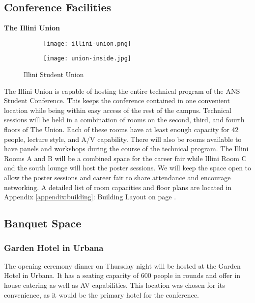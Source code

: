 \subsection{Conference Facilities}

\textbf{The Illini Union}\\

\begin{figure}[H]
	\centering
	\begin{subfigure}{0.5\textwidth}
		\centering
		\texttt{[image: illini-union.png]}
	\end{subfigure}%
	\begin{subfigure}{0.5\textwidth}
		\centering
		\texttt{[image: union-inside.jpg]}
	\end{subfigure}
	\caption{Illini Student Union}		
\end{figure} 


The Illini Union is capable of hosting the entire technical program of the ANS 
Student Conference. This keeps the conference contained in one convenient 
location while being within easy access of the rest of the campus. Technical 
sessions will be held in a combination of rooms on the second, third, and 
fourth floors of The Union. Each of these rooms have at least enough capacity 
for 42 people, lecture style, and A/V capability. There will also be rooms 
available to have panels and workshops during the course of the technical 
program. The Illini Rooms A and B will be a combined space for the career fair 
while Illini Room C and the south lounge will host the poster sessions. We will 
keep the space open to allow the poster sessions and career fair to share 
attendance and encourage networking. A detailed list of room capacities and 
floor plans are located in Appendix \ref{appendix:building}: Building Layout on 
page \pageref{appendix:building}. \\


\subsection{Banquet Space}
\subsubsection{Garden Hotel in Urbana}
The opening ceremony dinner on Thursday night will be hosted at the Garden Hotel in Urbana. It has a seating capacity of 600 people in rounds and offer in house catering as well as AV capabilities. This location was chosen for its convenience, as it would be the primary hotel for the conference. 


